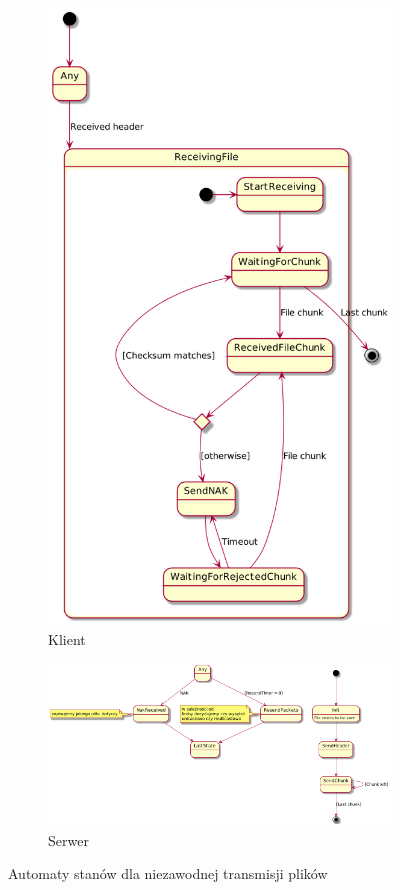 \documentclass[12pt, a4paper]{article}
\begin{document}
\begin{figure}[H]
\centering
  \begin{subfigure}[b]{0.48\linewidth}
    \includegraphics[width=0.7\linewidth]{client_state_diagram2.png}
    \caption{Klient}
  \end{subfigure}
  \begin{subfigure}[b]{0.48\linewidth}
    \includegraphics[width=\linewidth]{server_state_diagram2.png}
    \caption{Serwer}
  \end{subfigure}
\caption{Automaty stanów dla niezawodnej transmisji plików}
\label{fig:state_diagrams}
\end{figure}
\end{document}
